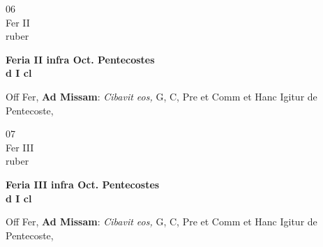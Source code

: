 \documentclass[10pt, openany]{book}
\begin{document}
        \begin{center}
            \begin{minipage}{3.5in}
                \vspace{2em}
                \begin{minipage}{0.5in}
                    {\Huge 06} \\
                    {\normalsize Fer II} \\
                    {\normalsize ruber}
                \end{minipage}
                \begin{minipage}{3.0in}
                    \textbf{ \large Feria II infra Oct. Pentecostes \\
                    \textnormal{\normalsize d I cl}} \\ 
                \end{minipage}
                \begin{justify}Off Fer, \textbf{Ad Missam}: \textit{Cibavit eos,} G, C, Pre et Comm et Hanc Igitur de Pentecoste,   
                \end{justify}
            \end{minipage}
        \end{center}
    
        \begin{center}
            \begin{minipage}{3.5in}
                \vspace{2em}
                \begin{minipage}{0.5in}
                    {\Huge 07} \\
                    {\normalsize Fer III} \\
                    {\normalsize ruber}
                \end{minipage}
                \begin{minipage}{3.0in}
                    \textbf{ \large Feria III infra Oct. Pentecostes \\
                    \textnormal{\normalsize d I cl}} \\ 
                \end{minipage}
                \begin{justify}Off Fer, \textbf{Ad Missam}: \textit{Cibavit eos,} G, C, Pre et Comm et Hanc Igitur de Pentecoste,   
                \end{justify}
            \end{minipage}
        \end{center}
    
\end{document}
